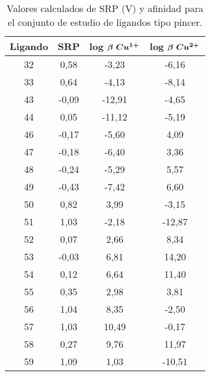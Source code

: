 \begin{table}[h]
\centering
\caption{Valores calculados de SRP (V) y afinidad para el conjunto de estudio de ligandos tipo pincer.}
\begin{tabular}{c|ccc}
\hline
\textbf{Ligando} & \textbf{SRP} & \textbf{log $\boldsymbol{\beta$ $Cu^{1+}}$} & \textbf{log $\boldsymbol{\beta$ $Cu^{2+}}$} \\ \hline
32               & 0,58             & -3,23                & -6,16                 \\
33               & 0,64             & -4,13                & -8,14                 \\
43               & -0,09            & -12,91               & -4,65                 \\
44               & 0,05             & -11,12               & -5,19                 \\
46               & -0,17            & -5,60                & 4,09                  \\
47               & -0,18            & -6,40                & 3,36                  \\
48               & -0,24            & -5,29                & 5,57                  \\
49               & -0,43            & -7,42                & 6,60                  \\
50               & 0,82             & 3,99                 & -3,15                 \\
51               & 1,03             & -2,18                & -12,87                \\
52               & 0,07             & 2,66                 & 8,34                  \\
53               & -0,03            & 6,81                 & 14,20                 \\
54               & 0,12             & 6,64                 & 11,40                 \\
55               & 0,35             & 2,98                 & 3,81                  \\
56               & 1,04             & 8,35                 & -2,50                 \\
57               & 1,03             & 10,49                & -0,17                 \\
58               & 0,27             & 9,76                 & 11,97                 \\
59               & 1,09             & 1,03                 & -10,51                \\

\end{tabular}
\end{table}
